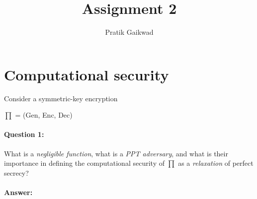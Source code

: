 \documentclass{article}
\title{Assignment 2}
\author{Pratik Gaikwad}
\begin{document}
\maketitle

\section{Computational security}
    
    Consider a symmetric-key encryption
    \begin{center}
        $ \prod $ = (Gen, Enc, Dec)
    \end{center}
    
    \paragraph{Question 1:} What is a \emph{negligible function}, what is a \emph{PPT adversary}, and what is their importance in defining the computational security of 
    \begin{math} 
        \prod 
    \end{math} as a \emph{relaxation} of perfect secrecy?
    
    \paragraph{Answer:\newline} 
    
\end{document}

